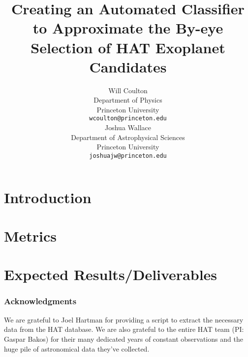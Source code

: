 \documentclass{article} %
\title{Creating an Automated Classifier to Approximate the By-eye
  Selection of HAT Exoplanet Candidates}
\author{
Will Coulton \\
Department of Physics \\
Princeton University\\
\texttt{wcoulton@princeton.edu} \\
\And
Joshua Wallace\\
Department of Astrophysical Sciences\\
Princeton University\\
\texttt{joshuajw@princeton.edu} \\
}
\begin{document}
\maketitle

\begin{abstract}

\end{abstract}

\section{Introduction}







\section{Metrics}


\section{Expected Results/Deliverables}


\subsubsection*{Acknowledgments}
We are grateful to Joel Hartman for providing a script to extract the
necessary data from the HAT database.  We are also grateful to the
entire HAT team (PI: Gaspar Bakos) for their many dedicated years of
constant observations and the huge pile of astronomical data they've collected.




\end{document}
